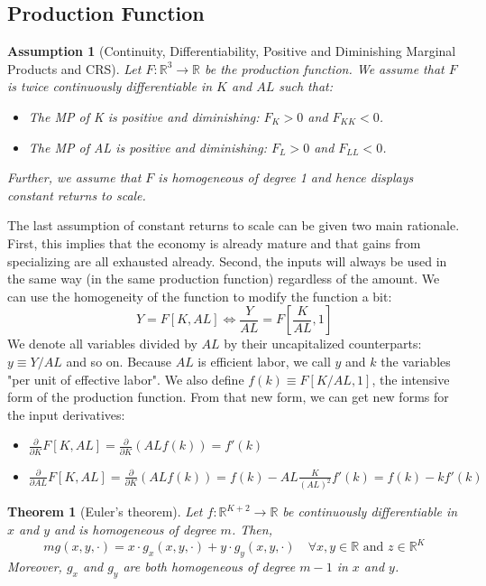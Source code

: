 \documentclass[12pt]{report}
\newtheorem{theorem}{Theorem}[chapter]
\newtheorem{assumption}{Assumption}[chapter]
\begin{document}
\subsection{Production Function}

\begin{assumption}[Continuity, Differentiability, Positive and Diminishing Marginal Products and CRS]
Let $F:\mathbb{R}^3\to\mathbb{R}$ be the production function. We assume that $F$ is twice continuously differentiable in $K$ and $AL$ such that:\begin{itemize}
\item The MP of K is positive and diminishing: $F_K > 0$ and $F_{KK} < 0$.
\item The MP of AL is positive and diminishing: $F_L > 0$ and $F_{LL} < 0$.
\end{itemize} Further, we assume that $F$ is homogeneous of degree 1 and hence displays constant returns to scale.
\end{assumption}

The last assumption of constant returns to scale can be given two main rationale. First, this implies that the economy is already mature and that gains from specializing are all exhausted already. Second, the inputs will always be used in the same way (in the same production function) regardless of the amount. We can use the homogeneity of the function to modify the function a bit: $$Y = F[K, AL] \Leftrightarrow \frac{Y}{AL} = F\left[\frac{K}{AL}, 1\right] $$ We denote all variables divided by $AL$ by their uncapitalized counterparts: $y\equiv Y/AL$ and so on. Because $AL$ is efficient labor, we call $y$ and $k$ the variables "per unit of effective labor". We also define $f(k)\equiv F\left[K/AL, 1\right] $, the intensive form of the production function. From that new form, we can get new forms for the input derivatives: \begin{itemize}
\item $\frac{\partial}{\partial K}F[K, AL] = \frac{\partial}{\partial K}(ALf(k)) = f'(k)$
\item $\frac{\partial}{\partial AL}F[K, AL] = \frac{\partial}{\partial K}(ALf(k)) = f(k) - AL\frac{K}{(AL)^2}f'(k) = f(k) - kf'(k) $
\end{itemize}

\begin{theorem}[Euler's theorem]
Let $f:\mathbb{R}^{K+2}\to\mathbb{R}$ be continuously differentiable in $x$ and $y$ and is homogeneous of degree $m$. Then, $$m g(x,y,\cdot) = x\cdot g_x(x,y,\cdot) + y\cdot g_y(x,y,\cdot) \quad \forall x,y\in\mathbb{R}\text{ and }z\in\mathbb{R}^K $$ Moreover, $g_x$ and $g_y$ are both homogeneous of degree $m-1$ in $x$ and $y$.
\end{theorem}
\end{document}
